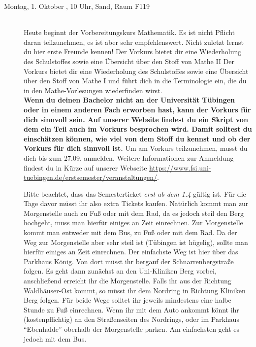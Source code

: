 \begin{description}
	
\item[Montag, 1. Oktober \Jahr, 10 Uhr, Sand, Raum F119]\ \\
Heute beginnt der Vorbereitungskurs Mathematik. Es ist nicht Pflicht daran teilzunehmen, 
es ist aber sehr empfehlenswert. Nicht zuletzt lernst du hier erste Freunde kennen!
\ifsommersemester
Der Vorkurs bietet dir eine Wiederholung des Schulstoffes sowie eine Übersicht über den Stoff von Mathe II 
\fi 
\ifwintersemester
Der Vorkurs bietet dir eine Wiederholung des Schulstoffes sowie eine Übersicht über den Stoff von Mathe I
\fi
und führt dich in die Terminologie ein, die du in den Mathe-Vorlesungen wiederfinden wirst.
\ifmaster
\\
\textbf{Wenn du deinen Bachelor nicht an der Universität Tübingen oder in einem anderen Fach erworben hast, kann der Vorkurs für dich sinnvoll sein. Auf unserer Website findest du ein Skript von dem ein Teil auch im Vorkurs besprochen wird. Damit solltest du einschätzen können, wie viel von dem Stoff du kennst und ob der Vorkurs für dich sinnvoll ist.}
\fi
Um am Vorkurs teilzunehmen, musst du dich bis zum 27.09. \Jahr anmelden. Weitere Informationen zur Anmeldung findest du in Kürze auf unserer Webseite \url{https://www.fsi.uni-tuebingen.de/erstsemester/veranstaltungen/}.

\ifsommersemester
Bitte beachtet, dass das Semesterticket \emph{erst ab dem 1.4} gültig ist. Für die Tage davor müsst ihr also extra Tickets kaufen. Natürlich kommt man zur Morgenstelle auch zu Fuß oder mit dem Rad, da es jedoch steil den Berg hochgeht, muss man hierfür einiges an Zeit einrechnen.
\fi
Zur Morgenstelle kommt man entweder mit dem Bus, zu Fuß oder mit dem Rad. Da der Weg zur Morgenstelle aber sehr steil ist (Tübingen ist hügelig), sollte man hierfür einiges an Zeit einrechnen.
Der einfachste Weg ist hier über das Parkhaus König. Von dort müsst ihr bergauf der Schnarrenbergstraße folgen. Es geht dann zunächst an den Uni-Kliniken Berg vorbei, anschließend erreicht ihr die Morgenstelle. Falls ihr aus der Richtung Waldh\"auser-Ost kommt, so m\"usst ihr dem Nordring in Richtung Kliniken Berg folgen. Für beide Wege solltet ihr jeweils mindestens eine halbe Stunde zu Fuß einrechnen.
Wenn ihr mit dem Auto ankommt k\"onnt ihr (kostenpflichtig) an den Straßenseiten des Nordrings, oder im Parkhaus "`Ebenhalde"' oberhalb der Morgenstelle parken. Am einfachsten geht es jedoch mit dem Bus.
   

\end{description}
